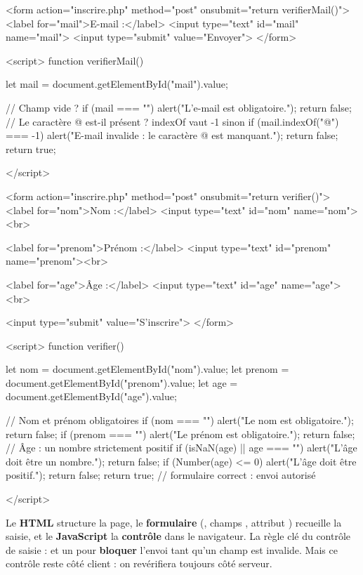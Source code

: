 \begin{codehtml}
<form action="inscrire.php" method="post" onsubmit="return verifierMail()">
  <label for="mail">E-mail :</label>
  <input type="text" id="mail" name="mail">
  <input type="submit" value="Envoyer">
</form>

<script>
  function verifierMail() {
    let mail = document.getElementById("mail").value;

    // Champ vide ?
    if (mail === "") {
      alert("L'e-mail est obligatoire.");
      return false;
    }
    // Le caractère @ est-il présent ? indexOf vaut -1 sinon
    if (mail.indexOf("@") === -1) {
      alert("E-mail invalide : le caractère @ est manquant.");
      return false;
    }
    return true;
  }
</script>
\end{codehtml}

\begin{codehtml}
<form action="inscrire.php" method="post" onsubmit="return verifier()">
  <label for="nom">Nom :</label>
  <input type="text" id="nom" name="nom"><br>

  <label for="prenom">Prénom :</label>
  <input type="text" id="prenom" name="prenom"><br>

  <label for="age">Âge :</label>
  <input type="text" id="age" name="age"><br>

  <input type="submit" value="S'inscrire">
</form>

<script>
  function verifier() {
    let nom = document.getElementById("nom").value;
    let prenom = document.getElementById("prenom").value;
    let age = document.getElementById("age").value;

    // Nom et prénom obligatoires
    if (nom === "") {
      alert("Le nom est obligatoire.");
      return false;
    }
    if (prenom === "") {
      alert("Le prénom est obligatoire.");
      return false;
    }
    // Âge : un nombre strictement positif
    if (isNaN(age) || age === "") {
      alert("L'âge doit être un nombre.");
      return false;
    }
    if (Number(age) <= 0) {
      alert("L'âge doit être positif.");
      return false;
    }
    return true;   // formulaire correct : envoi autorisé
  }
</script>
\end{codehtml}

\begin{aretenir}
Le \textbf{HTML} structure la page, le \textbf{formulaire} (, champs
, attribut ) recueille la saisie, et le \textbf{JavaScript}
la \textbf{contrôle} dans le navigateur. La règle clé du contrôle de saisie :
 et un  pour
\textbf{bloquer} l'envoi tant qu'un champ est invalide. Mais ce contrôle reste
côté client : on revérifiera toujours côté serveur.
\end{aretenir}

